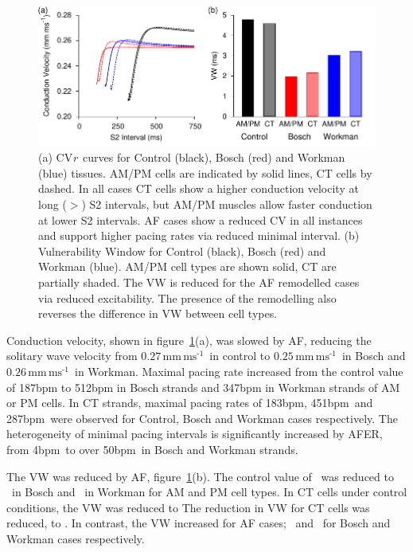\begin{figure}
\centering
\includegraphics{figures/toolkit/afer/figures/03_CVR}
\caption[AFER CVr curves and VWs]{
\label{fig:toolkit:afer:cvr}
(a) 
CV\emph{r}\ curves for Control (black), Bosch (red) and Workman (blue) tissues.
AM/PM cells are indicated by solid lines, CT cells by dashed.
In all cases CT cells show a higher conduction velocity at long
($>$) S2 intervals, but AM/PM muscles allow faster conduction at lower
S2 intervals.
AF cases show a reduced CV in all instances and support
higher pacing rates via reduced minimal interval.
(b) Vulnerability Window for Control (black), Bosch (red) and Workman (blue).
AM/PM cell types are shown solid, CT are partially shaded.
The VW is reduced for the AF remodelled cases via reduced excitability.
The presence of the remodelling also reverses the difference in VW between cell
types.
}
\end{figure}

Conduction velocity, shown in figure~\ref{fig:toolkit:afer:cvr}(a), was slowed by AF,
reducing the solitary wave velocity from $0.27\,\text{mm}\,\text{ms}^{\text{-1}}$\ in
control to $0.25\,\text{mm}\,\text{ms}^{\text{-1}}$\ in Bosch and
$0.26\,\text{mm}\,\text{ms}^{\text{-1}}$\ in
Workman.
Maximal pacing rate increased from the control value of \unit{187}{bpm} to
\unit{512}{bpm} in Bosch strands and \unit{347}{bpm} in Workman strands of AM or
PM cells.
In CT strands, maximal pacing rates of \unit{183}{bpm}, \unit{451}{bpm}\ and
\unit{287}{bpm}\ were observed for Control, Bosch and Workman cases
respectively.
The heterogeneity of minimal pacing intervals is significantly increased by
AFER, from \unit{4}{bpm}\ to over \unit{50}{bpm}\ in Bosch and Workman strands.

The VW was reduced by AF, figure~\ref{fig:toolkit:afer:cvr}(b).
The control value of \ was reduced to \ in Bosch and \ in Workman for AM and PM cell types.
In CT cells under control conditions, the VW was reduced to \ms{}
The reduction in VW for CT cells was reduced, to .
In contrast, the VW increased for AF cases; \ and \ for Bosch
and Workman cases respectively.


